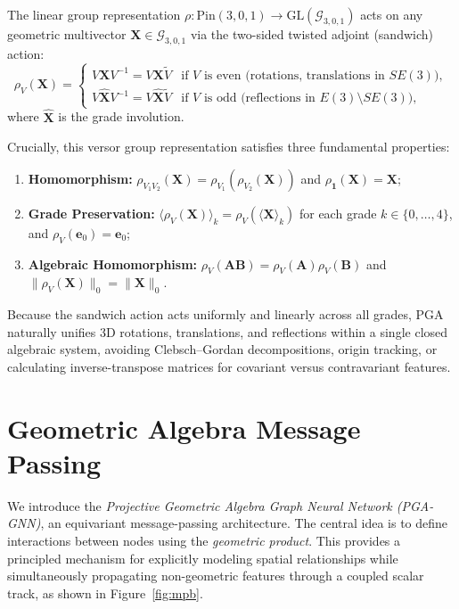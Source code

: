 \documentclass[10pt]{article}
\begin{document}
The linear group representation $\rho: \mathrm{Pin}(3,0,1) \to \mathrm{GL}(\mathcal{G}_{3,0,1})$ acts on any geometric multivector $\mathbf{X} \in \mathcal{G}_{3,0,1}$ via the two-sided twisted adjoint (sandwich) action:
\begin{equation}
    \rho_V(\mathbf{X}) = 
    \begin{cases} 
      V \mathbf{X} V^{-1} = V \mathbf{X} \widetilde{V} & \text{if } V \text{ is even (rotations, translations in } SE(3)\text{)}, \\
      V \widehat{\mathbf{X}} V^{-1} = V \widehat{\mathbf{X}} \widetilde{V} & \text{if } V \text{ is odd (reflections in } E(3) \setminus SE(3)\text{)},
   \end{cases}
   \label{eq:versor_action}
\end{equation}
where $\widehat{\mathbf{X}}$ is the grade involution. 

Crucially, this versor group representation satisfies three fundamental properties:
\begin{enumerate}
    \item \textbf{Homomorphism:} $\rho_{V_1 V_2}(\mathbf{X}) = \rho_{V_1}(\rho_{V_2}(\mathbf{X}))$ and $\rho_{\mathbf{1}}(\mathbf{X}) = \mathbf{X}$;
    \item \textbf{Grade Preservation:} $\langle \rho_V(\mathbf{X}) \rangle_k = \rho_V(\langle \mathbf{X} \rangle_k)$ for each grade $k \in \{0, \dots, 4\}$, and $\rho_V(\mathbf{e}_0) = \mathbf{e}_0$;
    \item \textbf{Algebraic Homomorphism:} $\rho_V(\mathbf{A}\mathbf{B}) = \rho_V(\mathbf{A})\rho_V(\mathbf{B})$ and $\|\rho_V(\mathbf{X})\|_0 = \|\mathbf{X}\|_0$.
\end{enumerate}
Because the sandwich action acts uniformly and linearly across all grades, PGA naturally unifies 3D rotations, translations, and reflections within a single closed algebraic system, avoiding Clebsch--Gordan decompositions, origin tracking, or calculating inverse-transpose matrices for covariant versus contravariant features.

\section{Geometric Algebra Message Passing}
\label{sec:method}

We introduce the \emph{Projective Geometric Algebra Graph Neural Network (PGA-GNN)}, an equivariant message-passing architecture. 
The central idea is to define interactions between nodes using the \emph{geometric product}. This provides a principled mechanism for explicitly modeling spatial relationships while simultaneously propagating non-geometric features through a coupled scalar track, as shown in Figure~\ref{fig:mpb}.
\end{document}
